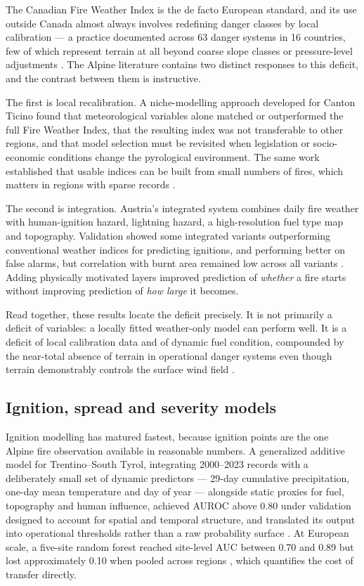 \documentclass[11pt,a4paper]{article}
\begin{document}
The Canadian Fire Weather Index is the de facto European standard, and its use outside Canada almost always involves redefining danger classes by local calibration --- a practice documented across 63 danger systems in 16 countries, few of which represent terrain at all beyond coarse slope classes or pressure-level adjustments \citep{zacharakis_environmental_2023}. The Alpine literature contains two distinct responses to this deficit, and the contrast between them is instructive.

The first is local recalibration. A niche-modelling approach developed for Canton Ticino found that meteorological variables alone matched or outperformed the full Fire Weather Index, that the resulting index was not transferable to other regions, and that model selection must be revisited when legislation or socio-economic conditions change the pyrological environment. The same work established that usable indices can be built from small numbers of fires, which matters in regions with sparse records \citep{de_angelis_modelling_2015}.

The second is integration. Austria's integrated system combines daily fire weather with human-ignition hazard, lightning hazard, a high-resolution fuel type map and topography. Validation showed some integrated variants outperforming conventional weather indices for predicting ignitions, and performing better on false alarms, but correlation with burnt area remained low across all variants \citep{muller_towards_2020}. Adding physically motivated layers improved prediction of \emph{whether} a fire starts without improving prediction of \emph{how large} it becomes.

Read together, these results locate the deficit precisely. It is not primarily a deficit of variables: a locally fitted weather-only model can perform well. It is a deficit of local calibration data and of dynamic fuel condition, compounded by the near-total absence of terrain in operational danger systems even though terrain demonstrably controls the surface wind field \citep{ozaki_impact_2022, sharples_overview_2009}.

\subsection{Ignition, spread and severity models}

Ignition modelling has matured fastest, because ignition points are the one Alpine fire observation available in reasonable numbers. A generalized additive model for Trentino--South Tyrol, integrating 2000--2023 records with a deliberately small set of dynamic predictors --- 29-day cumulative precipitation, one-day mean temperature and day of year --- alongside static proxies for fuel, topography and human influence, achieved AUROC above 0.80 under validation designed to account for spatial and temporal structure, and translated its output into operational thresholds rather than a raw probability surface \citep{moreno_1_nodate}. At European scale, a five-site random forest reached site-level AUC between 0.70 and 0.89 but lost approximately 0.10 when pooled across regions \citep{gelabert_assessing_2025}, which quantifies the cost of transfer directly.
\end{document}
